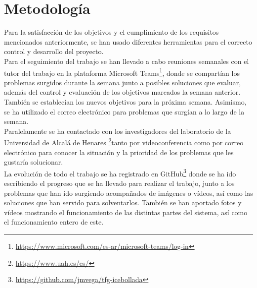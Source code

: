 \section{Metodología}
\label{sec:metodologia}
Para la satisfacción de los objetivos y el cumplimiento de los requisitos mencionados anteriormente, se han usado diferentes herramientas para el correcto control y desarrollo del proyecto.\\

Para el seguimiento del trabajo se han llevado a cabo reuniones semanales con el tutor del trabajo en la plataforma Microsoft Teams\footnote{\url{https://www.microsoft.com/es-ar/microsoft-teams/log-in}}, donde se compartían los problemas surgidos durante la semana junto a posibles soluciones que evaluar, además del control y evaluación de los objetivos marcados la semana anterior. También se establecían los nuevos objetivos para la próxima semana. Asimismo, se ha utilizado el correo electrónico para problemas que surgían a lo largo de la semana.\\

Paralelamente se ha contactado con los investigadores del laboratorio de la Universidad de Alcalá de Henares \footnote{\url{https://www.uah.es/es/}}tanto por videoconferencia como por correo electrónico para conocer la situación y la prioridad de los problemas que les gustaría solucionar.\\

La evolución de todo el trabajo se ha registrado en GitHub\footnote{\url{https://github.com/jmvega/tfg-icebollada}} donde se ha ido escribiendo el progreso que se ha llevado para realizar el trabajo, junto a los problemas que han ido surgiendo acompañados de imágenes o vídeos, así como las soluciones que han servido para solventarlos. También se han aportado fotos y vídeos mostrando el funcionamiento de las distintas partes del sistema, así como el funcionamiento entero de este.

